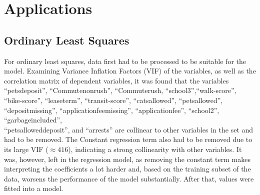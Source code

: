 \documentclass[12pt]{report}
\begin{document}
\section{Applications}
\subsection{Ordinary Least Squares}
For ordinary least squares, data first had to be processed to be suitable for the model. Examining Variance Inflation Factors (VIF) of the variables, as well as the correlation matrix of dependent variables, it was found that the variables ``pets\textunderscore deposit'', ``Commute\textunderscore nonrush'', ``Commute\textunderscore rush, ``school3'',``walk-score'', ``bike-score'', ``lease\textunderscore term'', ``transit-score'', ``cats\textunderscore allowed'', ``pets\textunderscore allowed'', ``deposit\textunderscore missing'', ``application\textunderscore fee\textunderscore missing'', ``application\textunderscore fee'', ``school2'', ``garbageincluded'', \\ ``pets\textunderscore allowed\textunderscore deposit'', and ``arrests'' are collinear to other variables in the set and had to be removed. The Constant regression term also had to be removed due to its large VIF ($\approx416$), indicating a strong collinearity with other variables. It was, however, left in the regression model, as removing the constant term makes interpreting the coefficients a lot harder and, based on the training subset of the data, worsens the performance of the model substantially. After that, values were fitted into a model.
\end{document}
